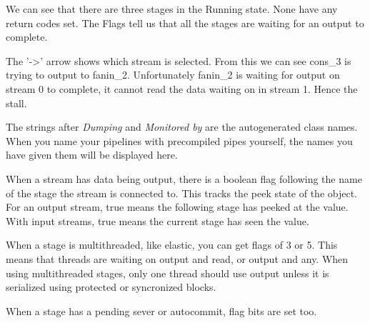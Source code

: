 We can see that there are three stages in the Running state.  None
have any return codes set.  The Flags tell us that all the stages are
waiting for an output to complete.

The '->' arrow shows which stream is
selected.  From this we can see cons\_3 is trying to output to
fanin\_2. Unfortunately fanin\_2 is waiting for output on stream 0 to
complete, it cannot read the data waiting on in stream 1.  Hence the
stall.

The strings after \emph{Dumping} and \emph{Monitored by} are the
autogenerated class names. When you name your pipelines with
precompiled pipes yourself, the names you have given them will be displayed here.

When a stream has data being output, there is a boolean flag following the name
of the stage the stream is connected to.
This tracks the peek state of the object.
For an output stream, true means the following stage has peeked at the value.
With input streams, true means the current stage has seen the value.

When a stage is multithreaded, like elastic, you can get flags of 3 or 5.
This means that threads are waiting on output and read, or output and any.
When using multithreaded stages, only one thread should use output
unless it is serialized using protected or syncronized blocks.

When a stage has a pending sever or autocommit, flag bits are set too.





 
  
